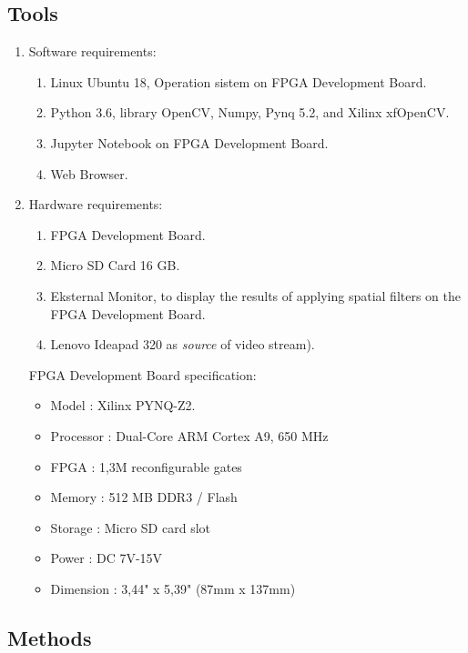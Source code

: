 \subsection{Tools}
\begin{enumerate}[topsep=0pt,itemsep=0pt,partopsep=0pt, parsep=0pt]
    \item Software requirements:
    \begin{enumerate}[topsep=0pt,itemsep=0pt,partopsep=0pt, parsep=0pt, label={\alph*.}]
        \item Linux Ubuntu 18, Operation sistem on FPGA Development Board.
        \item Python 3.6, library OpenCV, Numpy, Pynq 5.2, and Xilinx xfOpenCV.
        \item Jupyter Notebook on FPGA Development Board. 
        \item Web Browser.
    \end{enumerate}
    \item Hardware requirements:
    \begin{enumerate}[topsep=0pt,itemsep=0pt,partopsep=0pt, parsep=0pt, label={\alph*.}]
        \item FPGA Development Board.
        \item Micro SD Card 16 GB.
        \item Eksternal Monitor, to display the results of applying spatial filters on the FPGA Development Board.
        \item Lenovo Ideapad 320 as \textit{source} of video stream).
    \end{enumerate}

    FPGA Development Board specification:
    \begin{itemize}[topsep=0pt,itemsep=0pt,partopsep=0pt, parsep=0pt]
        \item Model : Xilinx PYNQ-Z2.
        \item Processor : Dual-Core ARM Cortex A9, 650 MHz
        \item FPGA : 1,3M reconfigurable gates
        \item Memory : 512 MB DDR3 / Flash
        \item Storage : Micro SD card slot
        \item Power : DC 7V-15V
        \item Dimension : 3,44" x 5,39" (87mm x 137mm)
    \end{itemize}
\end{enumerate}


\subsection{Methods}

